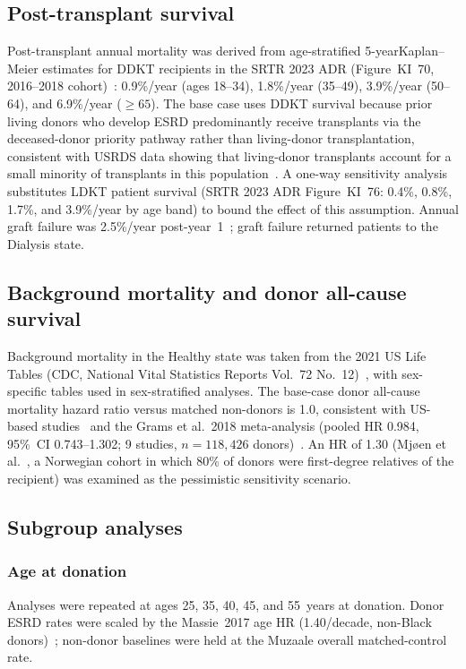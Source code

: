 \subsection{Post-transplant survival}
Post-transplant annual mortality was derived from age-stratified 5-yearKaplan--Meier estimates for DDKT recipients in the SRTR 2023 ADR (Figure~KI~70, 2016--2018 cohort)~\cite{srtr_2023}: 0.9\%/year (ages 18--34), 1.8\%/year (35--49), 3.9\%/year (50--64), and 6.9\%/year ($\geq 65$). The base case uses DDKT survival because prior living donors who develop ESRD predominantly receive transplants via the deceased-donor priority pathway rather than living-donor transplantation, consistent with USRDS data showing that living-donor transplants account for a small minority of transplants in this population~\cite{brar2018mortality,muzaale2016recipient}. A one-way sensitivity analysis substitutes LDKT patient survival (SRTR 2023 ADR Figure~KI~76: 0.4\%, 0.8\%, 1.7\%, and 3.9\%/year by age band) to bound the effect of this assumption. Annual graft failure was 2.5\%/year post-year~1~\cite{srtr_2023}; graft failure returned patients to the Dialysis state.

\subsection{Background mortality and donor all-cause survival}
Background mortality in the Healthy state was taken from the 2021 US Life Tables (CDC, National Vital Statistics Reports Vol.~72 No.~12)~\cite{cdc_2023}, with sex-specific tables used in sex-stratified analyses. The base-case donor all-cause mortality hazard ratio versus matched non-donors is 1.0, consistent with US-based studies~\cite{muzaale_risk_2014,segev_perioperative_2010} and the Grams et al.\ 2018 meta-analysis (pooled HR 0.984, 95\%~CI 0.743--1.302; 9 studies, $n = 118{,}426$ donors)~\cite{grams_mid-_2018}. An HR of 1.30 (Mjøen et al.\ \cite{mjoeen_long-term_2014}, a Norwegian cohort in which 80\% of donors were first-degree relatives of the recipient) was examined as the pessimistic sensitivity scenario.

\subsection{Subgroup analyses}

\subsubsection{Age at donation}
Analyses were repeated at ages 25, 35, 40, 45, and 55~years at donation. Donor ESRD rates were scaled by the Massie~2017 age HR (1.40/decade, non-Black donors)~\cite{massie_quantifying_2017}; non-donor baselines were held at the Muzaale overall matched-control rate.

